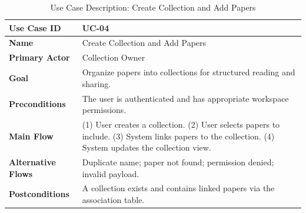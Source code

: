 \begin{table}[H]
    \centering
    \small
    \begin{tabularx}{\textwidth}{|l|X|}
        \hline
        \textbf{Use Case ID}       & UC-04                                                                                                                                                 \\
        \hline
        \textbf{Name}              & Create Collection and Add Papers                                                                                                                      \\
        \hline
        \textbf{Primary Actor}     & Collection Owner                                                                                                                                      \\
        \hline
        \textbf{Goal}              & Organize papers into collections for structured reading and sharing.                                                                                  \\
        \hline
        \textbf{Preconditions}     & The user is authenticated and has appropriate workspace permissions.                                                                                  \\
        \hline
        \textbf{Main Flow}         & (1) User creates a collection. (2) User selects papers to include. (3) System links papers to the collection. (4) System updates the collection view. \\
        \hline
        \textbf{Alternative Flows} & Duplicate name; paper not found; permission denied; invalid payload.                                                                                  \\
        \hline
        \textbf{Postconditions}    & A collection exists and contains linked papers via the association table.                                                                             \\
        \hline
    \end{tabularx}
    \caption{Use Case Description: Create Collection and Add Papers}
    \label{tab:srs-uc-04}
\end{table}

